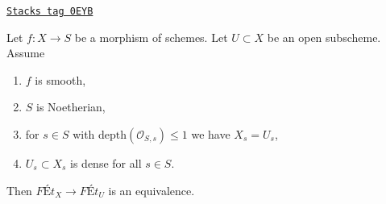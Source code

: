 \begin{lemma}
\label{pione-lemma-purity-smooth-over-depth2}
\href{https://stacks.math.columbia.edu/tag/0EYB}{\texttt{Stacks tag 0EYB}}

Let $f : X \to S$ be a morphism of schemes. Let $U \subset X$
be an open subscheme. Assume
\begin{enumerate}
\item $f$ is smooth,
\item $S$ is Noetherian,
\item for $s \in S$ with $\text{depth}(\mathcal{O}_{S, s}) \leq 1$
we have $X_s = U_s$,
\item $U_s \subset X_s$ is dense for all $s \in S$.
\end{enumerate}
Then $\textit{F\'Et}_X \to \textit{F\'Et}_U$ is an equivalence.
\end{lemma}

